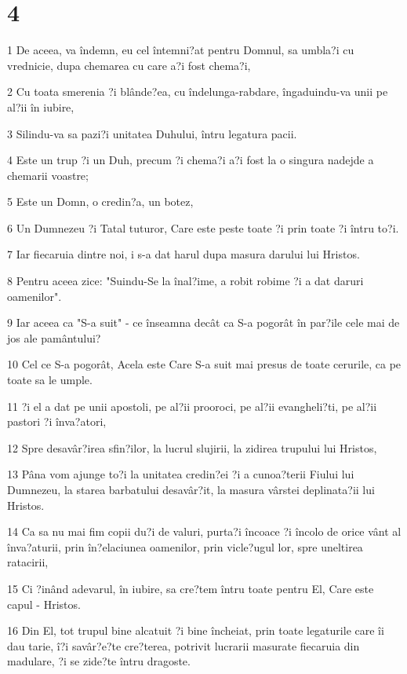 \chapter{4}

\par 1 De aceea, va îndemn, eu cel întemni?at pentru Domnul, sa umbla?i cu vrednicie, dupa chemarea cu care a?i fost chema?i,
\par 2 Cu toata smerenia ?i blânde?ea, cu îndelunga-rabdare, îngaduindu-va unii pe al?ii în iubire,
\par 3 Silindu-va sa pazi?i unitatea Duhului, întru legatura pacii.
\par 4 Este un trup ?i un Duh, precum ?i chema?i a?i fost la o singura nadejde a chemarii voastre;
\par 5 Este un Domn, o credin?a, un botez,
\par 6 Un Dumnezeu ?i Tatal tuturor, Care este peste toate ?i prin toate ?i întru to?i.
\par 7 Iar fiecaruia dintre noi, i s-a dat harul dupa masura darului lui Hristos.
\par 8 Pentru aceea zice: "Suindu-Se la înal?ime, a robit robime ?i a dat daruri oamenilor".
\par 9 Iar aceea ca "S-a suit" - ce înseamna decât ca S-a pogorât în par?ile cele mai de jos ale pamântului?
\par 10 Cel ce S-a pogorât, Acela este Care S-a suit mai presus de toate cerurile, ca pe toate sa le umple.
\par 11 ?i el a dat pe unii apostoli, pe al?ii prooroci, pe al?ii evangheli?ti, pe al?ii pastori ?i înva?atori,
\par 12 Spre desavâr?irea sfin?ilor, la lucrul slujirii, la zidirea trupului lui Hristos,
\par 13 Pâna vom ajunge to?i la unitatea credin?ei ?i a cunoa?terii Fiului lui Dumnezeu, la starea barbatului desavâr?it, la masura vârstei deplinata?ii lui Hristos.
\par 14 Ca sa nu mai fim copii du?i de valuri, purta?i încoace ?i încolo de orice vânt al înva?aturii, prin în?elaciunea oamenilor, prin vicle?ugul lor, spre uneltirea ratacirii,
\par 15 Ci ?inând adevarul, în iubire, sa cre?tem întru toate pentru El, Care este capul - Hristos.
\par 16 Din El, tot trupul bine alcatuit ?i bine încheiat, prin toate legaturile care îi dau tarie, î?i savâr?e?te cre?terea, potrivit lucrarii masurate fiecaruia din madulare, ?i se zide?te întru dragoste.
